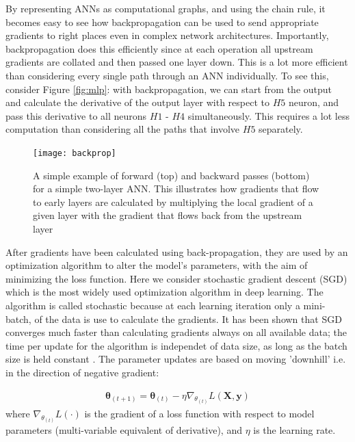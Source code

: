 \documentclass[12pt]{report}
\begin{document}
By representing ANNs as computational graphs, and using the chain rule, it becomes easy to see how backpropagation can be used to send appropriate gradients to right places even in complex network architectures. Importantly, backpropagation does this efficiently since at each operation all upstream gradients are collated and then passed one layer down. This is a lot more efficient than considering every single path through an ANN individually. To see this, consider Figure \ref{fig:mlp}: with backpropagation, we can start from the output and calculate the derivative of the output layer with respect to $H5$ neuron, and pass this derivative to all neurons $H1$ - $H4$ simultaneously. This requires a lot less computation than considering all the paths that involve $H5$ separately. 

\begin{figure}
  \centering
	\texttt{[image: backprop]}
	\caption{A simple example of forward (top) and backward passes (bottom) for a simple two-layer ANN. This illustrates how gradients that flow to early layers are calculated by multiplying the local gradient of a given layer with the gradient that flows back from the upstream layer}
	\label{fig:backprop}
\end{figure}

After gradients have been calculated using back-propagation, they are used by an optimization algorithm to alter the model's parameters, with the aim of minimizing the loss function. Here we consider stochastic gradient descent (SGD) \cite{Robbins1951} which is the most widely used optimization algorithm in deep learning. The algorithm is called stochastic because at each learning iteration only a mini-batch, of the data is use to calculate the gradients. It has been shown that SGD converges much faster than calculating gradients always on all available data; the time per update for the algorithm is independet of data size, as long as the batch size is held constant \cite{Goodfellow2016}. The parameter updates are based on moving 'downhill' i.e. in the direction of negative gradient:

\begin{align} \label{sgd_eq}
  \pmb{\theta}_{(t+1)}=\pmb{\theta}_{(t)} - \eta \nabla_{\theta_{(t)}}L(\mathbf{X}, \mathbf{y})
\end{align}
where $\nabla_{\theta_{(t)}}L(\cdot)$ is the gradient of a loss function with respect to model parameters (multi-variable equivalent of derivative), and $\eta$ is the learning rate.
\end{document}
